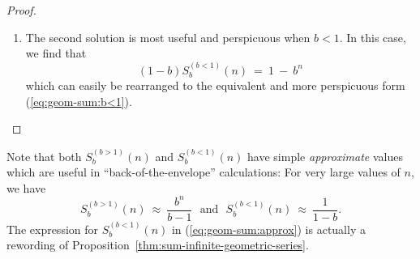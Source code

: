 \begin{proof}
\begin{enumerate}
\item
The second solution is most useful and perspicuous when $b < 1$.  In this
case, we find that
\[ (1-b) S^{(b<1)}_{b}(n) \ = \ 1 \ - \ b^n \]
which can easily be rearranged to the equivalent and more
perspicuous form (\ref{eq:geom-sum:b<1}).
\end{enumerate}
\end{proof}

Note that both $S^{(b>1)}_{b}(n)$ and $S^{(b<1)}_{b}(n)$ have simple
{\em approximate} values which are useful in ``back-of-the-envelope''
calculations: For very large values of $n$, we have
\begin{equation}
\label{eq:geom-sum:approx}
S^{(b>1)}_{b}(n) \ \approx \ \frac{b^n}{b-1} \ \ \
\mbox{and} \ \ \
S^{(b<1)}_{b}(n) \ \approx \ \frac{1}{1-b} .
\end{equation}
The expression for $S^{(b<1)}_{b}(n)$ in (\ref{eq:geom-sum:approx}) is
actually a rewording of
Proposition~\ref{thm:sum-infinite-geometric-series}.

\medskip

